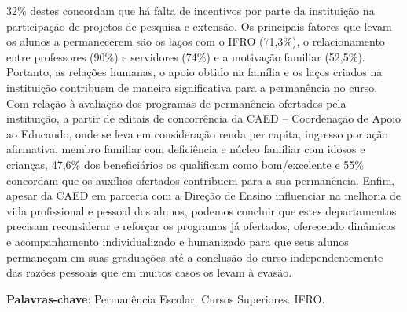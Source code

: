 \documentclass[article,12pt,onesidea,4paper,english,brazil]{abntex2}
\begin{document}
	32\% destes concordam que há falta de incentivos por parte da instituição na
	participação de projetos de pesquisa e extensão. Os principais fatores que levam os
	alunos a permanecerem são os laços com o IFRO (71,3\%), o relacionamento entre
	professores (90\%) e servidores (74\%) e a motivação familiar (52,5\%). Portanto, as
	relações humanas, o apoio obtido na família e os laços criados na instituição
	contribuem de maneira significativa para a permanência no curso. Com relação à
	avaliação dos programas de permanência ofertados pela instituição, a partir de
	editais de concorrência da CAED – Coordenação de Apoio ao Educando, onde se
	leva em consideração renda per capita, ingresso por ação afirmativa, membro
	familiar com deficiência e núcleo familiar com idosos e crianças, 47,6\% dos
	beneficiários os qualificam como bom/excelente e 55\% concordam que os auxílios
	ofertados contribuem para a sua permanência. Enfim, apesar da CAED em parceria
	com a Direção de Ensino influenciar na melhoria de vida profissional e pessoal dos
	alunos, podemos concluir que estes departamentos precisam reconsiderar e reforçar
	os programas já ofertados, oferecendo dinâmicas e acompanhamento
	individualizado e humanizado para que seus alunos permaneçam em suas
	graduações até a conclusão do curso independentemente das razões pessoais que
	em muitos casos os levam à evasão.
	
	\vspace{\onelineskip}
	
	\noindent
	\textbf{Palavras-chave}: Permanência Escolar. Cursos Superiores. IFRO.
\end{document}
